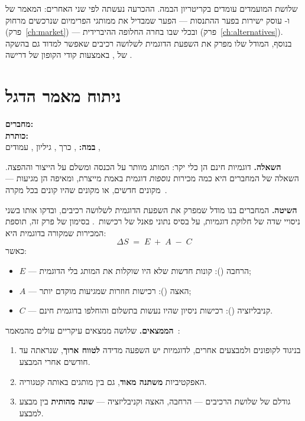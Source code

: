 שלושת המועמדים עומדים בקריטריון הבמה. ההכרעה נעשתה לפי שני האחרים: המאמר של
 ו- עוסק ישירות בפער ההתנסות --- הפער שמבדיל את 
ממותגי הפרימיום שנרכשים מרחוק (פרק~\ref{ch:market}) --- ובכלי שבו בחרה
החלופה ההיברידית (פרק~\ref{ch:alternatives}). בנוסף, המודל שלו מפרק את השפעת
הדוגמית לשלושה רכיבים שאפשר למדוד גם בהשקה של , באמצעות קודי הקופון
של דרישה \mbox{}.

\section{ניתוח מאמר הדגל}
\label{sec:lit-flagship-analysis}

\begin{definitionbox}
\textbf{מחברים:} ~\cite{bawa2004effects}\\
\textbf{כותרת:} \\
\textbf{במה:} , כרך , גיליון , עמודים , 
\end{definitionbox}

\textbf{השאלה.} דוגמיות חינם הן כלי יקר: המותג מוותר על הכנסה ומשלם על הייצור
וההפצה. השאלה של המחברים היא כמה מכירות \emph{נוספות} דוגמית באמת מייצרת, ומאיפה
הן מגיעות --- מקונים חדשים, או מקונים שהיו קונים בכל מקרה~\cite{bawa2004effects}.

\textbf{השיטה.} המחברים בנו מודל שמפרק את השפעת הדוגמית לשלושה רכיבים, ובדקו
אותו בשני ניסויי שדה של חלוקת דוגמיות, על בסיס נתוני פאנל של
רכישות~\cite{bawa2004effects}. בסימון של פרק זה, תוספת המכירות שמקורה בדוגמית
היא:
\begin{equation}
  \Delta S \;=\; E \;+\; A \;-\; C
  \label{eq:sampling-effect}
\end{equation}
כאשר:
\begin{itemize}
  \item $E$ --- הרחבה (): קונות חדשות שלא היו שוקלות את המותג בלי הדוגמית;
  \item $A$ --- האצה (): רכישות חוזרות שמגיעות מוקדם יותר;
  \item $C$ --- קניבליזציה (): רכישות ניסיון שהיו נעשות בתשלום
    והוחלפו בדוגמית חינם.
\end{itemize}

\textbf{הממצאים.} שלושה ממצאים עיקריים עולים מהמאמר~\cite{bawa2004effects}:
\begin{enumerate}
  \item בניגוד לקופונים ולמבצעים אחרים, לדוגמיות יש השפעה מדידה \textbf{לטווח
    ארוך}, שנראתה עד  חודשים אחרי המבצע.
  \item האפקטיביות \textbf{משתנה מאוד}, גם בין מותגים באותה קטגוריה.
  \item גודלם של שלושת הרכיבים --- הרחבה, האצה וקניבליזציה --- \textbf{שונה
    מהותית} בין מבצע למבצע.
\end{enumerate}


